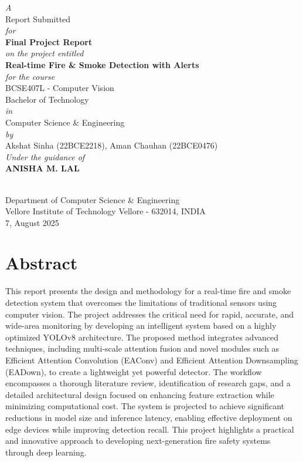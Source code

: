\documentclass[12pt,a4paper]{article}
\newcommand{\optionalinclude}[2]{%
  \IfFileExists{#1}{\texttt{[image: \#1]}}{\fbox{\rule{0pt}{0.35#2}\rule{#2}{0pt}}}}
\begin{document}
\begin{titlepage}
  \centering
  {\itshape A\\[1.2em]}
  {\large Report Submitted\\[0.8em]}
  {\itshape for\\[0.8em]}
  {\LARGE\bfseries Final Project Report\\[0.8em]}
  {\itshape on the project entitled\\[0.8em]}
  {\LARGE\bfseries Real-time Fire \& Smoke Detection with Alerts\\[1.0em]}
  {\itshape for the course\\[0.6em]}
  {\Large BCSE407L - Computer Vision\\[1.0em]}
  {\large Bachelor of Technology\\[0.5em]}
  {\itshape in\\[0.5em]}
  {\Large Computer Science \& Engineering\\[1.0em]}
  {\itshape by\\[0.5em]}
  {\large Akshat Sinha (22BCE2218), Aman Chauhan (22BCE0476)\\[1.2em]}
  {\itshape Under the guidance of\\[0.4em]}
  {\Large\bfseries ANISHA M. LAL\\[1.0em]}

  \optionalinclude{VIT LOGO.png}{0.28\textwidth}\\[1.0em]

  {Department of Computer Science \& Engineering\\[0.6em]}
  {Vellore Institute of Technology Vellore - 632014, INDIA\\[0.8em]}
  {7, August 2025}
\end{titlepage}

\section*{Abstract}
This report presents the design and methodology for a real-time fire and smoke detection system that overcomes the limitations of traditional sensors using computer vision. The project addresses the critical need for rapid, accurate, and wide-area monitoring by developing an intelligent system based on a highly optimized YOLOv8 architecture. The proposed method integrates advanced techniques, including multi-scale attention fusion and novel modules such as Efficient Attention Convolution (EAConv) and Efficient Attention Downsampling (EADown), to create a lightweight yet powerful detector. The workflow encompasses a thorough literature review, identification of research gaps, and a detailed architectural design focused on enhancing feature extraction while minimizing computational cost. The system is projected to achieve significant reductions in model size and inference latency, enabling effective deployment on edge devices while improving detection recall. This project highlights a practical and innovative approach to developing next-generation fire safety systems through deep learning.
\end{document}
